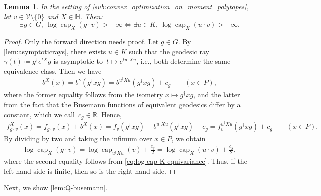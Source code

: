 \documentclass[11pt,letterpaper]{article}
\newtheorem{lemma}[theorem]{Lemma}\AddToHook{env/lemma/begin}{\crefalias{theorem}{lemma}}
\numberwithin{equation}{section}
\newcommand{\RR}{\mathbb{R}}
\newcommand{\bbH}{\mathbb{H}}
\newcommand{\VV}{\mathcal{V}}
\DeclareMathOperator{\capacity}{cap}
\begin{document}
\begin{lemma}\label{lem:shiftingtrick}
In the setting of \cref{sub:convex_optimization_on_moment_polytopes}, let $v \in \VV\setminus\{0\}$ and $X \in \bbH$.
Then:
    \[
        \exists g \in G,\ \log\capacity_X(g\cdot v) > -\infty \iff \exists u \in K,\ \log\capacity_X(u \cdot v) > -\infty.
    \]
\end{lemma}
\begin{proof}
Only the forward direction needs proof.
Let $g \in G$.
By \cref{lem:asymptoticrays}, there exists $u \in K$ such that the geodesic ray $\gamma(t) \coloneqq g^\dagger e^{tX}g$ is asymptotic to~$t \mapsto e^{t u^\dagger Xu}$, i.e., both determine the same equivalence class.
Then we have
\begin{align*}
    b^X(x)
= b^\gamma(g^\dagger x g)
= b^{u^\dagger X u}(g^\dagger x g) + c_g \qquad (x \in P),
\end{align*}
where the former equality follows from the isometry $x \mapsto g^\dagger xg$, and the latter from the fact that the Busemann functions of equivalent geodesics differ by a constant, which we call~$c_g \in \RR$.
Hence,
\begin{align*}
    f_{g\cdot v}^X(x)
= f_{g\cdot v}(x) + b^X(x)
= f_v(g^\dagger x g) + b^{u^\dagger X u}(g^\dagger x g) + c_g
= f_v^{u^\dagger X u}(g^\dagger x g) + c_g
\qquad (x \in P).
\end{align*}
By dividing by two and taking the infimum over $x \in P$, we obtain
\begin{align*}
    \log\capacity_X(g \cdot v)
= \log\capacity_{u^\dagger X u}(v) + \tfrac{c_g}2
= \log\capacity_X(u \cdot v) + \tfrac{c_g}2,
\end{align*}
where the second equality follows from \cref{eq:log cap K equivariance}.
Thus, if the left-hand side is finite, then so is the right-hand side.
\end{proof}

Next, we show \cref{lem:Q-busemann}.
\end{document}
